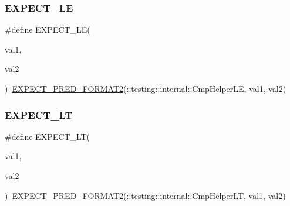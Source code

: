 \mbox{\label{_obj__test_2lib_2googletest-master_2googletest_2include_2gtest_2gtest_8h_ae0f265632323b4a07b585dcfde10f60a}} 
\subsubsection{\texorpdfstring{EXPECT\_LE}{EXPECT\_LE}}
{\footnotesize\ttfamily \#define E\+X\+P\+E\+C\+T\+\_\+\+LE(\begin{DoxyParamCaption}\item[{}]{val1,  }\item[{}]{val2 }\end{DoxyParamCaption})~\mbox{\hyperlink{_obj__test_2lib_2googletest-release-1_88_81_2googletest_2include_2gtest_2gtest__pred__impl_8h_af0141918615a5e2d5247e9cda8324dae}{E\+X\+P\+E\+C\+T\+\_\+\+P\+R\+E\+D\+\_\+\+F\+O\+R\+M\+A\+T2}}(\+::testing\+::internal\+::\+Cmp\+Helper\+LE, val1, val2)}

\mbox{\label{_obj__test_2lib_2googletest-master_2googletest_2include_2gtest_2gtest_8h_af28c06b2b5e8dee151896f299f6610cf}} 
\subsubsection{\texorpdfstring{EXPECT\_LT}{EXPECT\_LT}}
{\footnotesize\ttfamily \#define E\+X\+P\+E\+C\+T\+\_\+\+LT(\begin{DoxyParamCaption}\item[{}]{val1,  }\item[{}]{val2 }\end{DoxyParamCaption})~\mbox{\hyperlink{_obj__test_2lib_2googletest-release-1_88_81_2googletest_2include_2gtest_2gtest__pred__impl_8h_af0141918615a5e2d5247e9cda8324dae}{E\+X\+P\+E\+C\+T\+\_\+\+P\+R\+E\+D\+\_\+\+F\+O\+R\+M\+A\+T2}}(\+::testing\+::internal\+::\+Cmp\+Helper\+LT, val1, val2)}

\mbox{\label{_obj__test_2lib_2googletest-master_2googletest_2include_2gtest_2gtest_8h_a6ae7443947f25abc58bfcfcfc56b0d75}} 

